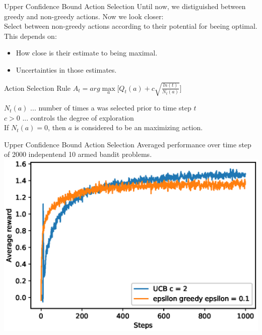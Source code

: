 \documentclass{beamer}
\begin{document}
\begin{frame}{Upper Confidence Bound Action Selection}
	Until now, we distiguished between greedy and non-greedy actions. Now we look closer: \\
	\vspace{0.2cm}
	Select between non-greedy actions according to their potential for beeing optimal.  This depends on: \\
	\begin{itemize}
	\item How close is their estimate to being maximal.
	\item Uncertainties in those estimates.
	\end{itemize}

	\begin{alertblock}{Action Selection Rule}
		$A_t = arg \max\limits_{a}  \big[ Q_t (a) + c \sqrt{\frac{ln (t)}{N_t (a)}} \big] $
	\end{alertblock}

	$N_t(a)$ ... number of times a was selected prior to time step $t$ \\
	$c > 0$ ... controls the degree of exploration \\
	If $N_t(a) = 0$,  then $a$ is considered to be an maximizing action.

\end{frame}

\begin{frame}{Upper Confidence Bound Action Selection}
Averaged performance over time step of 2000 indepentend 10 armed bandit problems.
	\includegraphics[width=0.9\linewidth]{Images/figure_2_4.eps}\\	
\end{frame}
\end{document}
